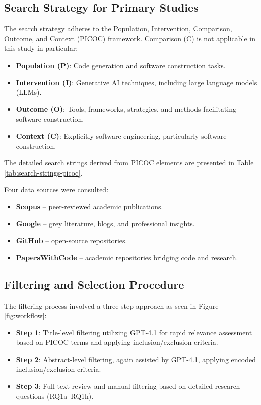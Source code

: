 \subsection{Search Strategy for Primary Studies}

The search strategy adheres to the Population, Intervention, Comparison, Outcome, and Context (PICOC) framework. Comparison (C) is not applicable in this study in particular:

\begin{itemize}
\item \textbf{Population (P)}: Code generation and software construction tasks.
\item \textbf{Intervention (I)}: Generative AI techniques, including large language models (LLMs).
\item \textbf{Outcome (O)}: Tools, frameworks, strategies, and methods facilitating software construction.
\item \textbf{Context (C)}: Explicitly software engineering, particularly software construction.
\end{itemize}

The detailed search strings derived from PICOC elements are presented in Table \ref{tab:search-strings-picoc}.

Four data sources were consulted:
\begin{itemize}
\item \textbf{Scopus} – peer-reviewed academic publications.
\item \textbf{Google} – grey literature, blogs, and professional insights.
\item \textbf{GitHub} – open-source repositories.
\item \textbf{PapersWithCode} – academic repositories bridging code and research.
\end{itemize}

\subsection{Filtering and Selection Procedure}

The filtering process involved a three-step approach as seen in Figure \ref{fig:workflow}:

\begin{itemize}
\item \textbf{Step 1}: Title-level filtering utilizing GPT-4.1 for rapid relevance assessment based on PICOC terms and applying inclusion/exclusion criteria.
\item \textbf{Step 2}: Abstract-level filtering, again assisted by GPT-4.1, applying encoded inclusion/exclusion criteria.
\item \textbf{Step 3}: Full-text review and manual filtering based on detailed research questions (RQ1a–RQ1h).
\end{itemize}

